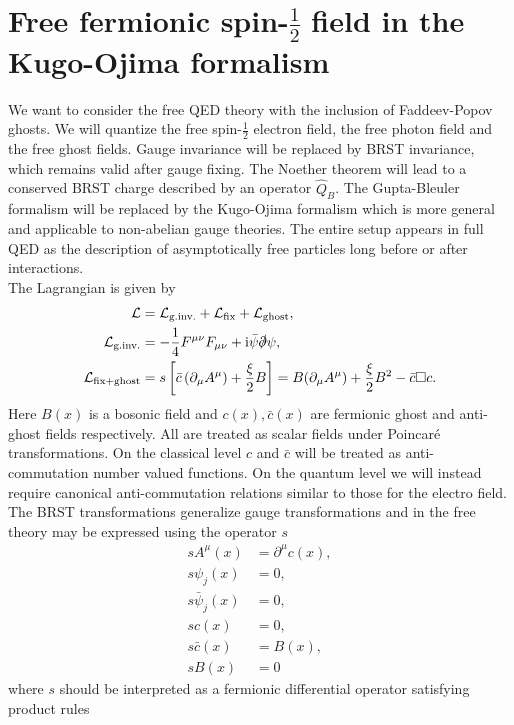 \documentclass[english, parskip=full]{scrartcl}
\newcommand{\kla}{}
\newcommand{\klam}{}
\newcommand{\tecxt}{}
\renewcommand{\i}{\text{i}}
\begin{document}
\section{Free fermionic spin-$\frac{1}{2}$ field in the Kugo-Ojima formalism}
We want to consider the free QED theory with the inclusion of Faddeev-Popov ghosts.
We will quantize the free spin-$\frac{1}{2}$ electron field, the free photon field and the free ghost fields.
Gauge invariance will be replaced by BRST invariance, which remains valid after gauge fixing.
The Noether theorem will lead to a conserved BRST charge described by an operator $\hat{Q}_B$.
The Gupta-Bleuler formalism will be replaced by the Kugo-Ojima formalism which is more general and applicable to non-abelian gauge theories.
The entire setup appears in full QED as the description of asymptotically free particles long before or after interactions.\\
The Lagrangian is given by
\begin{align}
\mathcal{L} &= \mathcal{L}_\tecxt\text{g.inv.} + \mathcal{L}_\tecxt\text{fix} + \mathcal{L}_\tecxt\text{ghost},\\
\mathcal{L}_\tecxt\text{g.inv.} &= -\frac{1}{4} F^{\mu\nu} F_{\mu\nu} + \i \bar{\psi} \slashed{\partial} \psi,\\
\mathcal{L}_\tecxt\text{fix+ghost} &= s\klam\left[ \bar{c} \kla\left( \partial_\mu A^\mu  \right) + \frac{\xi}{2}B \right] = B (\partial_\mu A^\mu ) + \frac{\xi}{2}B^2 - \bar{c} \square c.
\end{align}
Here $B(x)$ is a bosonic field and $c(x),\bar{c}(x)$ are fermionic ghost and anti-ghost fields respectively.
All are treated as scalar fields under Poincar\'e transformations.
On the classical level $c$ and $\bar{c}$ will be treated as anti-commutation number valued functions.
On the quantum level we will instead require canonical anti-commutation relations similar to those for the electro field.
The BRST transformations generalize gauge transformations and in the free theory may be expressed using the operator $s$ 
\begin{align}
sA^\mu (x) &= \partial^\mu c(x),\\
s\psi_j(x) &= 0,\\
s \bar{\psi}_j(x) &= 0,\\
sc(x) &= 0,\\
s\bar{c}(x) &= B(x),\\
sB(x) &= 0
\end{align}
where $s$ should be interpreted as a fermionic differential operator satisfying product rules
\end{document}
